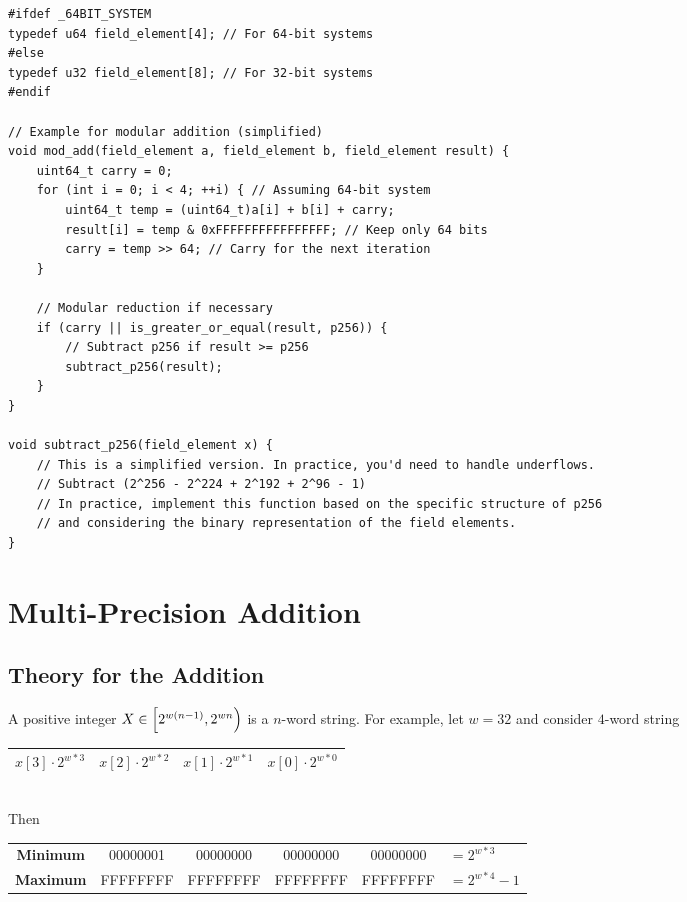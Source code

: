 \vspace{4pt}
\begin{lstlisting}[style=C]
#ifdef _64BIT_SYSTEM
typedef u64 field_element[4]; // For 64-bit systems
#else
typedef u32 field_element[8]; // For 32-bit systems
#endif

// Example for modular addition (simplified)
void mod_add(field_element a, field_element b, field_element result) {
	uint64_t carry = 0;
	for (int i = 0; i < 4; ++i) { // Assuming 64-bit system
		uint64_t temp = (uint64_t)a[i] + b[i] + carry;
		result[i] = temp & 0xFFFFFFFFFFFFFFFF; // Keep only 64 bits
		carry = temp >> 64; // Carry for the next iteration
	}
	
	// Modular reduction if necessary
	if (carry || is_greater_or_equal(result, p256)) {
		// Subtract p256 if result >= p256
		subtract_p256(result);
	}
}

void subtract_p256(field_element x) {
	// This is a simplified version. In practice, you'd need to handle underflows.
	// Subtract (2^256 - 2^224 + 2^192 + 2^96 - 1)
	// In practice, implement this function based on the specific structure of p256
	// and considering the binary representation of the field elements.
}
\end{lstlisting}

\newpage
\section{Multi-Precision Addition}

\subsection{Theory for the Addition}

\begin{note}
A positive integer $X\in\intco{2^{w(n-1)}, 2^{wn}}$ is a $n$-word string. For example, let $w=32$ and consider $4$-word string
\begin{table}[h!]\centering\renewcommand{\arraystretch}{1.25}
\begin{tabular}{|c|c|c|c|}
\hline
$x[3]\cdot 2^{w*3}$ & $x[2]\cdot 2^{w*2}$ & $x[1]\cdot 2^{w*1}$ & $x[0]\cdot 2^{w*0}$\\
\hline
\end{tabular}
\end{table}\\
Then
\begin{table}[h!]\centering\renewcommand{\arraystretch}{1.25}
{\ttfamily\begin{tabular}{c|c|c|c|c|l}
\cline{2-5}
\textnormal{\bf Minimum} & 00000001 & 00000000 & 00000000 & 00000000 & $=2^{w*3}$\\ \cline{2-5}
\textnormal{\bf Maximum} & FFFFFFFF & FFFFFFFF & FFFFFFFF & FFFFFFFF & $=2^{w*4}-1$\\ \cline{2-5}
\end{tabular}}
\end{table}
\end{note}

